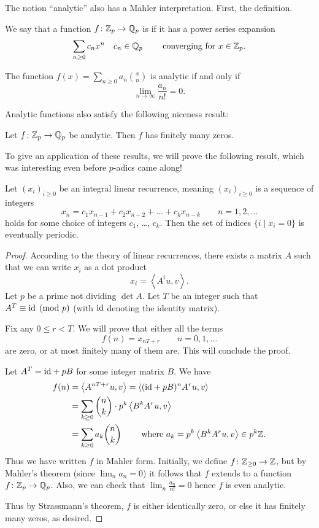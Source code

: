 The notion ``analytic'' also has a Mahler interpretation.
First, the definition.
\begin{definition}
We say that a function $f \colon \mathbb Z_p \to \mathbb Q_p$ is 
if it has a power series expansion
\[ \sum_{n \ge 0} c_n x^n \quad c_n \in \mathbb Q_p
	\qquad\text{ converging for } x \in \mathbb Z_p. \]
\end{definition}
\begin{theorem}
	The function $f(x) = \sum_{n \ge 0} a_n \binom xn$ is analytic
	if and only if
	\[ \lim_{n \to \infty} \frac{a_n}{n!} = 0. \]
\end{theorem}
Analytic functions also satisfy the following niceness result:
\begin{theorem}
	Let $f \colon \mathbb Z_p \to \mathbb Q_p$ be analytic.
	Then $f$ has finitely many zeros.
\end{theorem}

To give an application of these results,
we will prove the following result,
which was interesting even before $p$-adics came along!
\begin{theorem}
	Let $(x_i)_{i \ge 0}$ be an integral linear recurrence,
	meaning $(x_i)_{i \ge 0}$ is a sequence of integers
	\[ x_n = c_1 x_{n-1} + c_2 x_{n-2} + \dots + c_k x_{n-k}
		\qquad n = 1, 2, \dots \]
	holds for some choice of integers $c_1$, \dots, $c_k$.
	Then the set of indices $\{ i \mid x_i = 0 \}$
	is eventually periodic.
\end{theorem}

\begin{proof}
	According to the theory of linear recurrences,
	there exists a matrix $A$ such that we can write
	$x_i$ as a dot product
	\[ x_i = \left< A^i u, v \right>. \]
	Let $p$ be a prime not dividing $\det A$.
	Let $T$ be an integer such that $A^T \equiv \mathrm{id} \pmod p$
	(with $\mathrm{id}$ denoting the identity matrix).

	Fix any $0 \le r < T$.
	We will prove that either all the terms
	\[ f(n) = x_{nT+r} \qquad n = 0, 1, \dots \]
	are zero, or at most finitely many of them are.
	This will conclude the proof.

	Let $A^T = \mathrm{id} + pB$ for some integer matrix $B$.
	We have
	\begin{align*}
		f(n) &= \left< A^{nT+r} u, v \right>
		= \left< (\mathrm{id} + pB)^n A^r u, v \right> \\
		&= \sum_{k \ge 0} \binom nk \cdot p^k \left< B^k A^r u, v \right> \\
		&= \sum_{k \ge 0} a_k \binom nk \qquad \text{ where }
			a_k = p^k \left< B^k A^r u, v \right> \in p^k \mathbb Z.
	\end{align*}
	Thus we have written $f$ in Mahler form.
	Initially, we define $f \colon \mathbb Z_{\ge 0} \to \mathbb Z$,
	but by Mahler's theorem (since $\lim_n a_n = 0$)
	it follows that $f$ extends to a function $f \colon \mathbb Z_p \to \mathbb Q_p$.
	Also, we can check that $\lim_n \frac{a_n}{n!} = 0$
	hence $f$ is even analytic.

	Thus by Strassmann's theorem, $f$ is either identically zero,
	or else it has finitely many zeros, as desired.
\end{proof}

